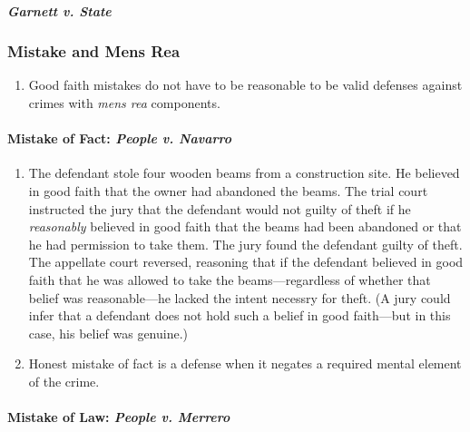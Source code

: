\paragraph{\emph{Garnett v. State}}


\subsubsection{Mistake and Mens Rea}

\begin{enumerate}
    \item Good faith mistakes do not have to be reasonable to be valid defenses against crimes with \emph{mens rea} components.
\end{enumerate}

\paragraph{Mistake of Fact: \emph{People v. Navarro}}

\begin{enumerate}
    \item The defendant stole four wooden beams from a construction site. He believed in good faith that the owner had abandoned the beams. The trial court instructed the jury that the defendant would not guilty of theft if he \emph{reasonably} believed in good faith that the beams had been abandoned or that he had permission to take them. The jury found the defendant guilty of theft. The appellate court reversed, reasoning that if the defendant believed in good faith that he was allowed to take the beams---regardless of whether that belief was reasonable---he lacked the intent necessry for theft. (A jury could infer that a defendant does not hold such a belief in good faith---but in this case, his belief was genuine.)
    \item Honest mistake of fact is a defense when it negates a required mental element of the crime.
\end{enumerate}

\paragraph{Mistake of Law: \emph{People v. Merrero}}

